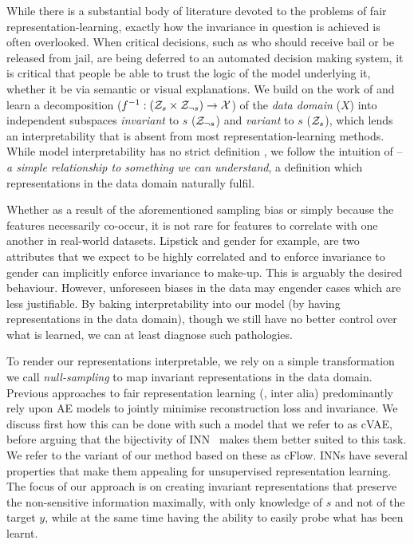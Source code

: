 While there is a substantial body of literature devoted to the problems of fair
representation-learning, exactly how the invariance in question is achieved is often overlooked.
%
When critical decisions, such as who should receive bail or be released from jail, are being
deferred to an automated decision making system, it is critical that people be able to trust the
logic of the model underlying it, whether it be via semantic or visual explanations. 
%
We build on the work of \citet{QuaShaTho19} and learn a decomposition ($f^{-1}: ({\mathcal{Z}}_s \times
{\mathcal{Z}}_{\neg s}) \to {\mathcal{X}}$) of the \emph{data domain} ($X$) into independent subspaces
\emph{invariant} to  $s$ (${\mathcal{Z}}_{\neg s}$) and \emph{variant} to $s$ (${\mathcal{Z}}_{s}$), which lends an
interpretability that is absent from most representation-learning methods. 
%
While model interpretability has no strict definition \citep{zhang2018visual}, we follow the
intuition of \citet{adel2018discovering} -- \emph{a simple relationship to something we can
understand}, a definition which representations in the data domain naturally fulfil.

Whether as a result of the aforementioned sampling bias or simply because the features necessarily
co-occur, it is not rare for features to correlate with one another in real-world datasets.
%
Lipstick and gender for example, are two attributes that we expect to be highly correlated and to
enforce invariance to gender can implicitly enforce invariance to make-up. 
%
This is arguably the desired behaviour. 
%
However, unforeseen biases in the data may engender cases which are less justifiable. 
%
By baking interpretability into our model (by having representations in the data domain), though we
still have no better control over what is learned, we can at least diagnose such pathologies.

To render our representations interpretable, we rely on a simple transformation we call
\emph{null-sampling} to map invariant representations in the data domain. 
%
Previous approaches to fair representation learning
(\cite{beutel2017data,edwards2016censoring,madras2018learning,louizos2016variational}, inter alia)
predominantly rely upon \ac{AE} models to jointly minimise reconstruction loss and invariance. 
%
We discuss first how this can be done with such a model that we refer to as \ac{cVAE}, before
arguing that the bijectivity of \ac{INN}~\citep{Dinh2014} makes them better suited to this task. 
%
We refer to the variant of our method based on these as \ac{cFlow}. 
%
INNs have several properties that make them appealing for unsupervised representation learning. 
%
The focus of our approach is on creating invariant representations that preserve the non-sensitive
information maximally, with only knowledge of $s$ and not of the target $y$, while at the same time
having the ability to easily probe what has been learnt.

